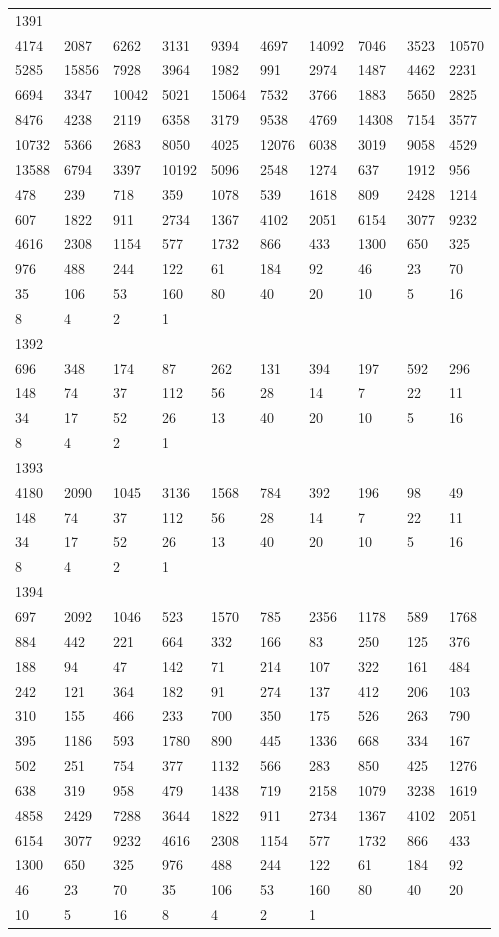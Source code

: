 \begin{longtable}{*{10}{l}}
1391&&&&&&&&&\\
4174& 2087& 6262& 3131& 9394& 4697& 14092& 7046& 3523& 10570\\
5285& 15856& 7928& 3964& 1982& 991& 2974& 1487& 4462& 2231\\
6694& 3347& 10042& 5021& 15064& 7532& 3766& 1883& 5650& 2825\\
8476& 4238& 2119& 6358& 3179& 9538& 4769& 14308& 7154& 3577\\
10732& 5366& 2683& 8050& 4025& 12076& 6038& 3019& 9058& 4529\\
13588& 6794& 3397& 10192& 5096& 2548& 1274& 637& 1912& 956\\
478& 239& 718& 359& 1078& 539& 1618& 809& 2428& 1214\\
607& 1822& 911& 2734& 1367& 4102& 2051& 6154& 3077& 9232\\
4616& 2308& 1154& 577& 1732& 866& 433& 1300& 650& 325\\
976& 488& 244& 122& 61& 184& 92& 46& 23& 70\\
35& 106& 53& 160& 80& 40& 20& 10& 5& 16\\
8& 4& 2& 1& \\

1392&&&&&&&&&\\
696& 348& 174& 87& 262& 131& 394& 197& 592& 296\\
148& 74& 37& 112& 56& 28& 14& 7& 22& 11\\
34& 17& 52& 26& 13& 40& 20& 10& 5& 16\\
8& 4& 2& 1& \\

1393&&&&&&&&&\\
4180& 2090& 1045& 3136& 1568& 784& 392& 196& 98& 49\\
148& 74& 37& 112& 56& 28& 14& 7& 22& 11\\
34& 17& 52& 26& 13& 40& 20& 10& 5& 16\\
8& 4& 2& 1& \\

1394&&&&&&&&&\\
697& 2092& 1046& 523& 1570& 785& 2356& 1178& 589& 1768\\
884& 442& 221& 664& 332& 166& 83& 250& 125& 376\\
188& 94& 47& 142& 71& 214& 107& 322& 161& 484\\
242& 121& 364& 182& 91& 274& 137& 412& 206& 103\\
310& 155& 466& 233& 700& 350& 175& 526& 263& 790\\
395& 1186& 593& 1780& 890& 445& 1336& 668& 334& 167\\
502& 251& 754& 377& 1132& 566& 283& 850& 425& 1276\\
638& 319& 958& 479& 1438& 719& 2158& 1079& 3238& 1619\\
4858& 2429& 7288& 3644& 1822& 911& 2734& 1367& 4102& 2051\\
6154& 3077& 9232& 4616& 2308& 1154& 577& 1732& 866& 433\\
1300& 650& 325& 976& 488& 244& 122& 61& 184& 92\\
46& 23& 70& 35& 106& 53& 160& 80& 40& 20\\
10& 5& 16& 8& 4& 2& 1& \\


\end{longtable}
